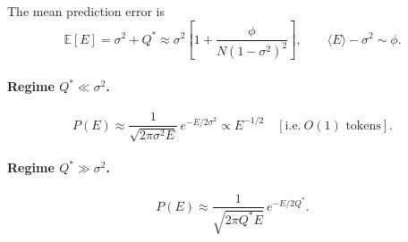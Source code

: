 \documentclass[aps,prb,onecolumn,showpacs,preprintnumbers,amsmath,amssymb]{revtex4-2}
\begin{document}
The mean prediction error is
\begin{equation}
    \mathbb{E}[E] = \sigma^2 + Q^*
    \approx \sigma^2\!\left[1 + \frac{\phi}{N(1-\sigma^2)^2}\right],
    \qquad \langle E\rangle - \sigma^2 \sim \phi.
\end{equation}

\paragraph{Regime $Q^* \ll \sigma^2$.}
\begin{equation}
    P(E) \approx \frac{1}{\sqrt{2\pi\sigma^2 E}}\,e^{-E/2\sigma^2}
    \propto E^{-1/2} \quad [\text{i.e.}\ O(1)\text{ tokens}].
\end{equation}

\paragraph{Regime $Q^* \gg \sigma^2$.}
\begin{equation}
    P(E) \approx \frac{1}{\sqrt{2\pi Q^* E}}\,e^{-E/2Q^*}.
\end{equation}
\end{document}
